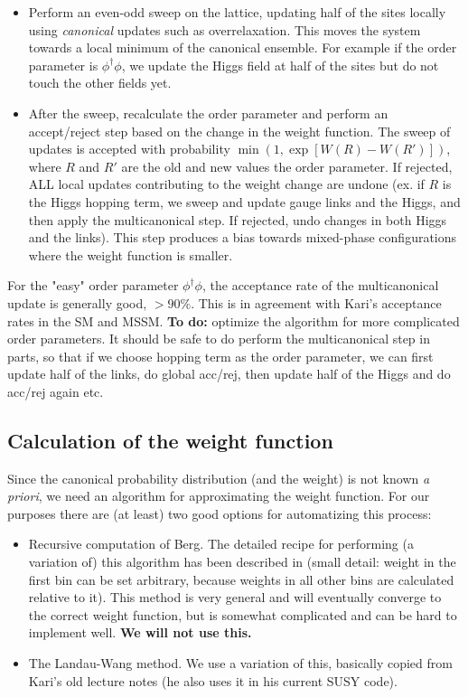 \documentclass[11pt,a4paper]{article}
\begin{document}
\begin{itemize}
	
	\item Perform an even-odd sweep on the lattice, updating half of the sites locally using \textit{canonical} updates such as overrelaxation. This moves the system towards a local minimum of the canonical ensemble. For example if the order parameter is $\phi^\dagger\phi$, we update the Higgs field at half of the sites but do not touch the other fields yet.
	
	\item After the sweep, recalculate the order parameter and perform an accept/reject step based on the change in the weight function. The sweep of updates is accepted with probability $\min(1, \exp[W(R) - W(R') ])$, where $R$ and $R'$ are the old and new values the order parameter. If rejected, ALL local updates contributing to the weight change are undone (ex. if $R$ is the Higgs hopping term, we sweep and update gauge links and the Higgs, and then apply the multicanonical step. If rejected, undo changes in both Higgs and the links). This step produces a bias towards mixed-phase configurations where the weight function is smaller. 
	
\end{itemize}

For the "easy" order parameter $\phi^\dagger\phi$, the acceptance rate of the multicanonical update is generally good, $>90\%$. This is in agreement with Kari's acceptance rates in the SM and MSSM. \textbf{To do:} optimize the algorithm for more complicated order parameters. It should be safe to do perform the multicanonical step in parts, so that if we choose hopping term as the order parameter, we can first update half of the links, do global acc/rej, then update half of the Higgs and do acc/rej again etc.

\subsection{Calculation of the weight function}

Since the canonical probability distribution (and the weight) is not known \textit{a priori}, we need an algorithm for approximating the weight function. For our purposes there are (at least) two good options for automatizing this process: 
\begin{itemize}
	
	\item Recursive computation of Berg. The detailed recipe for performing (a variation of) this algorithm has been described in \cite{Laine:1998qk} (small detail: weight in the first bin can be set arbitrary, because weights in all other bins are calculated relative to it). This method is very general and will eventually converge to the correct weight function, but is somewhat complicated and can be hard to implement well. \textbf{We will not use this.}
	
	\item The Landau-Wang method. We use a variation of this, basically copied from Kari's old lecture notes (he also uses it in his current SUSY code). 
	
\end{itemize}
\end{document}
